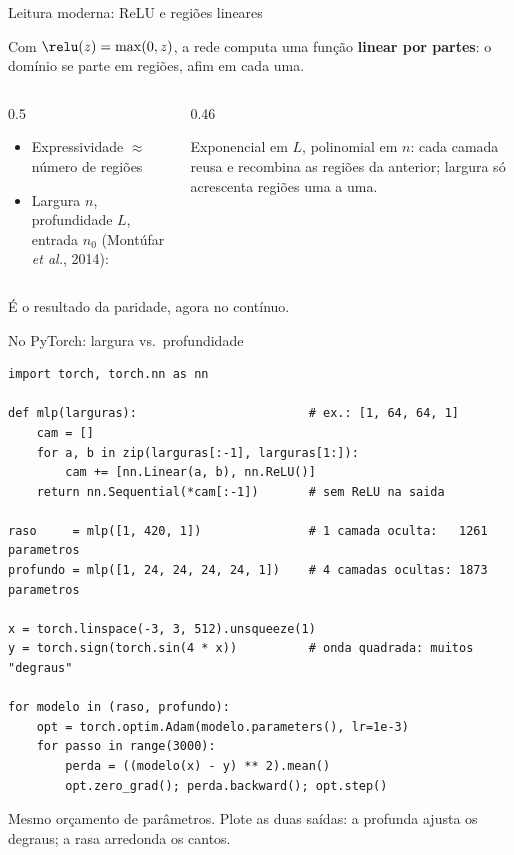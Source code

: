 \documentclass[aspectratio=169, 11pt]{beamer}
\begin{document}
\begin{frame}{Leitura moderna: ReLU e regiões lineares}

  Com $\relu(z) = \max(0, z)$, a rede computa uma função \textbf{linear por
  partes}: o domínio se parte em regiões, afim em cada uma.

  \medskip
  \begin{columns}[T]
    \begin{column}{0.5\textwidth}
      \begin{itemize}\setlength{\itemsep}{0.25ex}
        \item Expressividade $\approx$ número de regiões
        \item Largura $n$, profundidade $L$, entrada $n_0$
              (Montúfar \emph{et al.}, 2014):
      \end{itemize}
      \smallskip
    \end{column}
    \begin{column}{0.46\textwidth}
      \begin{ideiabox}
        Exponencial em $L$, polinomial em $n$: cada camada reusa e
        recombina as regiões da anterior; largura só acrescenta regiões
        uma a uma.
      \end{ideiabox}
    \end{column}
  \end{columns}

  \medskip
  É o resultado da paridade, agora no contínuo.
\end{frame}

\begin{frame}[fragile]{No PyTorch: largura vs.\ profundidade}

\begin{lstlisting}
import torch, torch.nn as nn

def mlp(larguras):                        # ex.: [1, 64, 64, 1]
    cam = []
    for a, b in zip(larguras[:-1], larguras[1:]):
        cam += [nn.Linear(a, b), nn.ReLU()]
    return nn.Sequential(*cam[:-1])       # sem ReLU na saida

raso     = mlp([1, 420, 1])               # 1 camada oculta:   1261 parametros
profundo = mlp([1, 24, 24, 24, 24, 1])    # 4 camadas ocultas: 1873 parametros

x = torch.linspace(-3, 3, 512).unsqueeze(1)
y = torch.sign(torch.sin(4 * x))          # onda quadrada: muitos "degraus"

for modelo in (raso, profundo):
    opt = torch.optim.Adam(modelo.parameters(), lr=1e-3)
    for passo in range(3000):
        perda = ((modelo(x) - y) ** 2).mean()
        opt.zero_grad(); perda.backward(); opt.step()
\end{lstlisting}

  \vspace{-2pt}
  {\small Mesmo orçamento de parâmetros. Plote as duas saídas: a profunda
  ajusta os degraus; a rasa arredonda os cantos.}
\end{frame}
\end{document}
